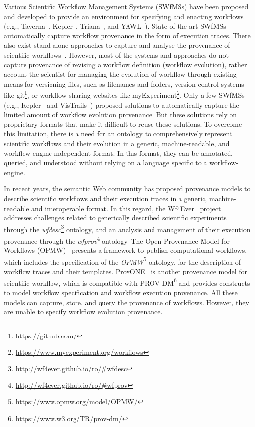\documentclass[ao]{iosart2x}
\begin{document}
Various Scientific Workflow Management Systems (SWfMSs) have been proposed and developed to provide an environment for specifying and enacting workflows (e.g., Taverna~\citep{hull2006taverna}, Kepler~\citep{altintas2004kepler}, Triana~\citep{taylor2007triana}, and YAWL~\citep{van2005yawl}). 
State-of-the-art SWfMSs automatically capture workflow provenance in the form of execution traces.
There also exist stand-alone approaches to capture and analyse the provenance of scientific workflows~\citep{oliveira2018provenance,prabhune2018p}. 
However, most of the systems and approaches do not capture provenance of revising a workflow definition (workflow evolution), rather account the scientist for managing the evolution of workflow through existing means for versioning files, such as filenames and folders, version control systems like git\footnote{\url{https://github.com/}}, or workflow sharing websites like myExperiment\footnote{\url{https://www.myexperiment.org/workflows}}.
Only a few SWfMSs (e.g., Kepler~\citep{altintas2004kepler} and VisTrails~\citep{freire2006managing}) proposed solutions to automatically capture the limited amount of workflow evolution provenance. But these solutions rely on proprietary formats that make it difficult to reuse these solutions.  
To overcome this limitation, there is a need for an ontology to comprehensively represent scientific workflows and their evolution in a generic, machine-readable, and workflow-engine independent format. In this format, they can be annotated, queried, and understood without relying on a language specific to a workflow-engine. 

In recent years, the semantic Web community has proposed provenance models to describe scientific workflows and their execution traces in a generic, machine-readable and interoperable format.
In this regard, the Wf4Ever~\citep{belhajjame2015using} project addresses challenges related to generically described scientific experiments through the \textit{wfdesc}\footnote{\url{http://wf4ever.github.io/ro/\#wfdesc}} ontology, and an analysis and management of their execution provenance through the \textit{wfprov}\footnote{\url{http://wf4ever.github.io/ro/\#wfprov}} ontology.  
The Open Provenance Model for Workflows (OPMW)~\citep{Garijo:2011:NAP:2110497.2110504} presents a framework to publish computational workflows, which includes the specification of the \textit{OPMW}\footnote{\url{https://www.opmw.org/model/OPMW/}} ontology, for the description of workflow traces and their templates. 
ProvONE~\citep{cuevas2016provone} is another provenance model for scientific workflow, which is compatible with PROV-DM\footnote{\url{https://www.w3.org/TR/prov-dm/}} and provides constructs to model workflow specification and workflow execution provenance. 
All these models can capture, store, and query the provenance of workflows. However, they are unable to specify workflow evolution provenance. 
\end{document}
